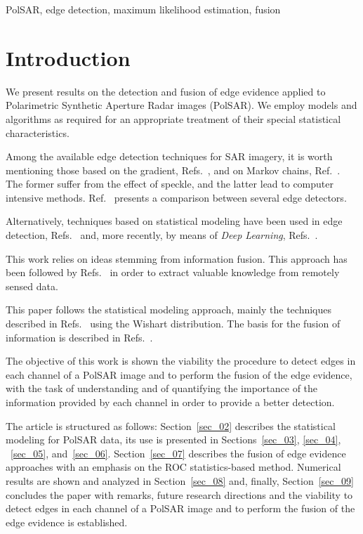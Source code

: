 \documentclass[conference]{IEEEtran}
\begin{document}
\begin{IEEEkeywords}
PolSAR, edge detection, maximum likelihood estimation, fusion
\end{IEEEkeywords}

\section{Introduction}\label{sec_01}

We present results on the detection and fusion of edge evidence applied to Polarimetric Synthetic Aperture Radar images (PolSAR). 
We employ models and algorithms as required for an appropriate treatment of their special statistical characteristics.

Among the available edge detection techniques for SAR imagery, it is worth mentioning those based on the gradient, Refs.~\cite{tlb, obw, flmc, fyf}, and on Markov chains, Ref.~\cite{bf}.
The former suffer from the effect of speckle, and the latter lead to computer intensive methods.
Ref.~\cite{gfn} presents a comparison between several edge detectors. 

Alternatively, techniques based on statistical modeling have been used in edge detection, Refs.~\cite{gmbf, fbgm, horrit, gfn} and, more recently, by means of \textit{Deep Learning}, Refs.~\cite{bac, ztmxzxf, tabmm, xstz}.

This work relies on ideas stemming from information fusion.
This approach has been followed by Refs.~\cite{sglmla,sg} in order to extract valuable knowledge from remotely sensed data.

This paper follows the statistical modeling approach, mainly the techniques described in Refs.~\cite{fbgm, nhfc} using the Wishart distribution.
The basis for the fusion of information is described in Refs.~\cite{mit, sg}. 

The objective of this work is shown the viability the procedure to detect edges in each channel of a PolSAR image and to perform the fusion of the edge evidence, with the task of understanding and of quantifying the importance of the information provided by each channel in order to provide a better detection.

The article is structured as follows: 
Section~\ref{sec_02} describes the statistical modeling for PolSAR data, 
its use is presented in Sections~\ref{sec_03}, \ref{sec_04}, ~\ref{sec_05}, and~\ref{sec_06}.
Section~\ref{sec_07} describes the fusion of edge evidence approaches with an emphasis on the ROC statistics-based method.
Numerical results are shown and analyzed in Section~\ref{sec_08} and, finally, Section~\ref{sec_09} concludes the paper with remarks, future research directions and the viability  to detect edges in each channel of a PolSAR image and to perform the fusion of the edge evidence is established.
\end{document}

